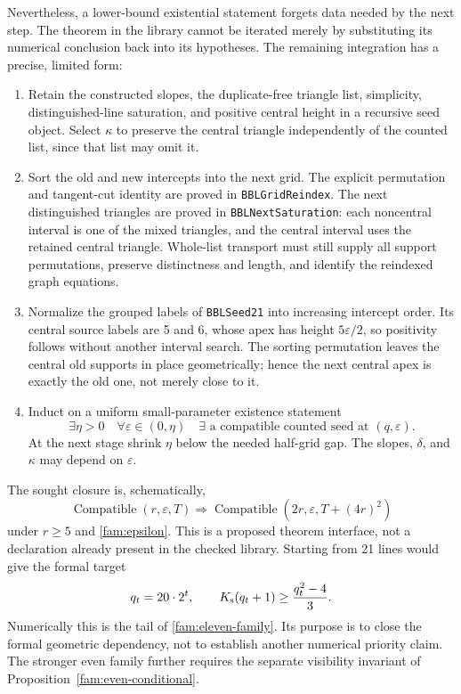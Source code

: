 Nevertheless, a lower-bound existential statement forgets data needed
by the next step.  The theorem in the library cannot be iterated merely
by substituting its numerical conclusion back into its hypotheses.
The remaining integration has a precise, limited form:
\begin{enumerate}
\item Retain the constructed slopes, the duplicate-free triangle list,
simplicity, distinguished-line saturation, and positive central height
in a recursive seed object.  Select $\kappa$ to preserve the central
triangle independently of the counted list, since that list may omit it.
\item Sort the old and new intercepts into the next grid.  The explicit
permutation and tangent-cut identity are proved in
\texttt{BBLGridReindex}.  The next distinguished triangles are proved
in \texttt{BBLNextSaturation}: each noncentral interval is one of the
mixed triangles, and the central interval uses the retained central
triangle.  Whole-list transport must still supply all support
permutations, preserve distinctness and length, and identify the
reindexed graph equations.
\item Normalize the grouped labels of \texttt{BBLSeed21} into increasing
intercept order.  Its central source labels are 5 and 6, whose apex has
height $5\varepsilon/2$, so positivity follows without another interval
search.  The sorting permutation leaves the central old supports in
place geometrically; hence the next central apex is exactly the old
one, not merely close to it.
\item Induct on a uniform small-parameter existence statement
\begin{equation}
 \exists\eta>0\quad\forall\varepsilon\in(0,\eta)\quad
 \exists\text{ a compatible counted seed at }(q,\varepsilon).
 \label{fam:recursive-quantifier}
\end{equation}
At the next stage shrink $\eta$ below the needed half-grid gap.  The
slopes, $\delta$, and $\kappa$ may depend on $\varepsilon$.
\end{enumerate}
The sought closure is, schematically,
\[
 \operatorname{Compatible}(r,\varepsilon,T)
 \Longrightarrow
 \operatorname{Compatible}(2r,\varepsilon,T+(4r)^2)
\]
under $r\geq5$ and \eqref{fam:epsilon}.  This is a proposed theorem
interface, not a declaration already present in the checked library.
Starting from 21 lines would give the formal target
\begin{equation}
 q_t=20\cdot2^t,\qquad
 K_{\mathrm{s}}(q_t+1)\geq\frac{q_t^2-4}{3}.
 \label{fam:21-target}
\end{equation}
Numerically this is the tail of \eqref{fam:eleven-family}.  Its purpose
is to close the formal geometric dependency, not to establish another
numerical priority claim.  The stronger even family further requires
the separate visibility invariant of
Proposition~\ref{fam:even-conditional}.

